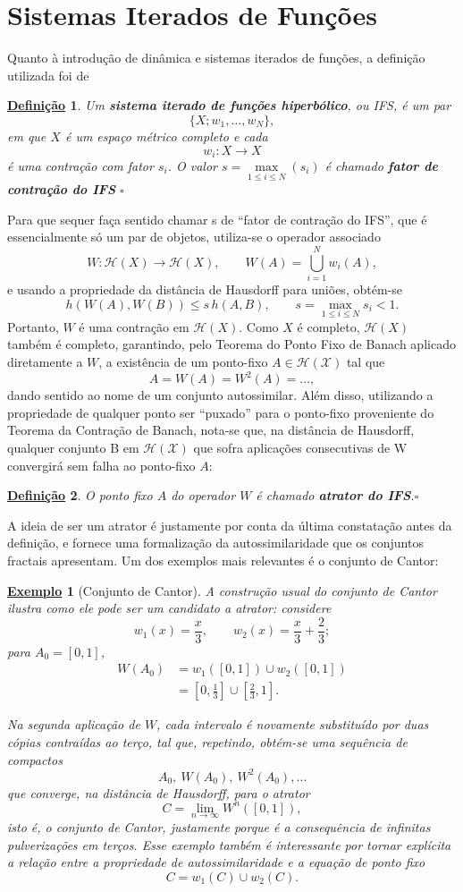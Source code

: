 \documentclass[12pt, a4paper]{article}
\newtheorem*{def*}{\underline{Definição}}
\newtheorem{example}{\underline{Exemplo}}
\theoremstyle{definition}
\newcommand{\Hc}{\mathcal{H}}
\begin{document}
\section*{Sistemas Iterados de Funções}
Quanto à introdução de dinâmica e sistemas iterados de funções, a definição utilizada foi de
\begin{def*}
	Um \textbf{sistema iterado de funções hiperbólico}, ou IFS, é um par
	\[
		\{X;w_1,\ldots,w_N\},
	\]
	em que $X$ é um espaço métrico completo e cada
	\[
		w_i:X\to X
	\]
	é uma contração com fator $s_i$. O valor \(s=\max\limits_{1\leq i\leq N}(s_{i})\) é chamado \textbf{fator de contração do IFS} \(\square\)
\end{def*}
Para que sequer faça sentido chamar s de ``fator de contração do IFS'', que é essencialmente só um par de objetos, utiliza-se o operador associado
\[
	W:\Hc(X)\to\Hc(X),
	\qquad
	W(A)=\bigcup_{i=1}^{N}w_i(A),
\]
e usando a propriedade da distância de Hausdorff para uniões, obtém-se
\[
	h(W(A),W(B))
	\leq
	s\,h(A,B),
	\qquad
	s=\max_{1\leq i\leq N}s_i<1.
\]
Portanto, $W$ é uma contração em $\Hc(X)$.
Como $X$ é completo, $\Hc(X)$ também é completo, garantindo, pelo Teorema do Ponto Fixo de Banach aplicado diretamente a $W$, a existência de um ponto-fixo \(A\in \mathcal{H(X)}\) tal que
\[
	A = W(A) = W^{2}(A) = \dotsc ,
\]
dando sentido ao nome de um conjunto autossimilar. Além disso, utilizando a propriedade de qualquer ponto ser ``puxado'' para o ponto-fixo proveniente do Teorema da Contração de Banach, nota-se que, na distância de Hausdorff, qualquer conjunto B em \(\mathcal{H(X)}\) que sofra aplicações consecutivas de W convergirá sem falha ao ponto-fixo \(A\):
\begin{def*}
	O ponto fixo $A$ do operador $W$ é chamado \textbf{atrator do IFS}.\(\square\)
\end{def*}
A ideia de ser um atrator é justamente por conta da última constatação antes da definição, e fornece uma formalização da autossimilaridade que os conjuntos fractais apresentam. Um dos exemplos mais relevantes é o conjunto de Cantor:
\begin{example}[Conjunto de Cantor]
	A construção usual do conjunto de Cantor ilustra como ele pode ser um candidato a atrator: considere
	\[
		w_1(x)=\frac{x}{3},
		\qquad
		w_2(x)=\frac{x}{3}+\frac{2}{3};
	\]
	para $A_0=[0,1]$,
	\[
		\begin{aligned}
			W(A_0)
			 & =w_1([0,1])\cup w_2([0,1]) \\
			 & =\left[0,\frac13\right]
			\cup
			\left[\frac23,1\right].
		\end{aligned}
	\]

	Na segunda aplicação de $W$, cada intervalo é novamente substituído por duas cópias contraídas ao terço, tal que, repetindo, obtém-se uma sequência de compactos
	\[
		A_0,\ W(A_0),\ W^2(A_0),\ldots
	\]
	que converge, na distância de Hausdorff, para o atrator
	\[
		C=\lim_{n\to\infty}W^n([0,1]),
	\]
	isto é, o conjunto de Cantor, justamente porque é a consequência de infinitas pulverizações em terços.
	Esse exemplo também é interessante por tornar explícita a relação entre a propriedade de autossimilaridade e a equação de ponto fixo
	\[
		C=w_1(C)\cup w_2(C).
	\]
\end{example}
\end{document}

